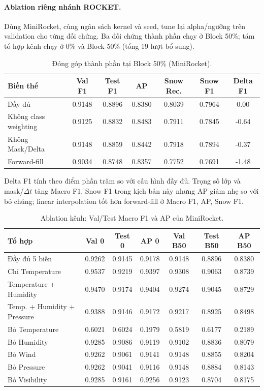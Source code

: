 \paragraph{Ablation riêng nhánh ROCKET.} Dùng MiniRocket, cùng ngân sách kernel và seed, tune lại alpha/ngưỡng trên validation cho từng đối chứng. Ba đối chứng thành phần chạy ở Block 50\%; tám tổ hợp kênh chạy ở 0\% và Block 50\% (tổng 19 lượt bổ sung).
\begin{table}[H]
\centering
\small
\caption{Đóng góp thành phần tại Block 50\% (MiniRocket).}
\label{tab:rocket-components}
\begin{tabular}{@{}lcccccc@{}}
\toprule
\textbf{Biến thể} & \textbf{Val F1} & \textbf{Test F1} & \textbf{AP} & \textbf{Snow Rec.} & \textbf{Snow F1} & \textbf{Delta F1} \\
\midrule
Đầy đủ & 0.9148 & 0.8896 & 0.8380 & 0.8039 & 0.7964 & 0.00 \\
Không class weighting & 0.9125 & 0.8832 & 0.8483 & 0.7911 & 0.7845 & -0.64 \\
Không Mask/Delta & 0.9148 & 0.8859 & 0.8442 & 0.7918 & 0.7894 & -0.37 \\
Forward-fill & 0.9034 & 0.8748 & 0.8357 & 0.7752 & 0.7691 & -1.48 \\
\bottomrule
\end{tabular}
\end{table}
Delta F1 tính theo điểm phần trăm so với cấu hình đầy đủ. Trọng số lớp và mask/$\Delta t$ tăng Macro F1, Snow F1 trong kịch bản này nhưng AP giảm nhẹ so với bỏ chúng; linear interpolation tốt hơn forward-fill ở Macro F1, AP, Snow F1.
\begin{table}[H]
\centering
\small
\caption{Ablation kênh: Val/Test Macro F1 và AP của MiniRocket.}
\label{tab:rocket-channels}
\begin{tabular}{@{}lcccccc@{}}
\toprule
\textbf{Tổ hợp} & \textbf{Val 0} & \textbf{Test 0} & \textbf{AP 0} & \textbf{Val B50} & \textbf{Test B50} & \textbf{AP B50} \\
\midrule
Đầy đủ 5 biến & 0.9262 & 0.9145 & 0.9178 & 0.9148 & 0.8896 & 0.8380 \\
Chỉ Temperature & 0.9537 & 0.9219 & 0.9397 & 0.9308 & 0.9063 & 0.8739 \\
Temperature + Humidity & 0.9470 & 0.9174 & 0.9404 & 0.9274 & 0.9045 & 0.8729 \\
Temp. + Humidity + Pressure & 0.9388 & 0.9146 & 0.9172 & 0.9217 & 0.8925 & 0.8498 \\
Bỏ Temperature & 0.6021 & 0.6024 & 0.1979 & 0.5819 & 0.6177 & 0.2189 \\
Bỏ Humidity & 0.9285 & 0.9086 & 0.9119 & 0.9102 & 0.8836 & 0.8079 \\
Bỏ Wind & 0.9262 & 0.9061 & 0.9141 & 0.9148 & 0.8855 & 0.8204 \\
Bỏ Pressure & 0.9262 & 0.9041 & 0.9116 & 0.9148 & 0.8884 & 0.8143 \\
Bỏ Visibility & 0.9285 & 0.9161 & 0.9256 & 0.9123 & 0.8704 & 0.8175 \\
\bottomrule
\end{tabular}
\end{table}

